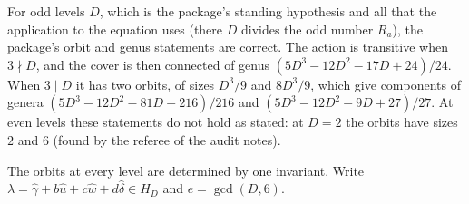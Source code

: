 For odd levels $D$, which is the package's standing hypothesis and all that the application to the equation uses (there $D$ divides the odd number $R_a$), the package's orbit and genus statements are correct. The action is transitive when $3\nmid D$, and the cover is then connected of genus $(5D^3-12D^2-17D+24)/24$. When $3\mid D$ it has two orbits, of sizes $D^3/9$ and $8D^3/9$, which give components of genera $(5D^3-12D^2-81D+216)/216$ and $(5D^3-12D^2-9D+27)/27$. At even levels these statements do not hold as stated: at $D=2$ the orbits have sizes $2$ and $6$ (found by the referee of the audit notes).

The orbits at every level are determined by one invariant. Write $\lambda=\hat\gamma+b\hat u+c\hat w+d\hat\delta\in H_D$ and $e=\gcd(D,6)$.

